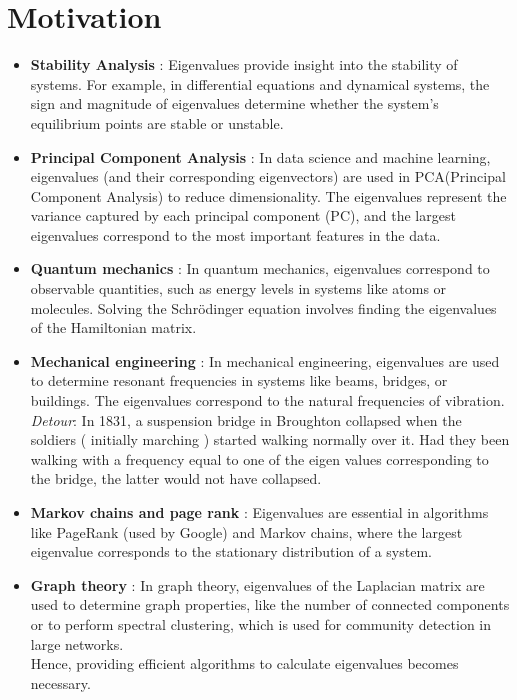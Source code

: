 \documentclass[report,12pt,onecolumn]{IEEEtran}
\theoremstyle{remark}
\begin{document}
\section{\Large Motivation }
\begin{itemize}
	\item \textbf{Stability Analysis} : 
		Eigenvalues provide insight into the stability of systems. For example, in differential equations and dynamical systems, the sign and magnitude of eigenvalues determine whether the system's equilibrium points are stable or unstable.
	\item \textbf{Principal Component Analysis} :
		In data science and machine learning, eigenvalues (and their corresponding eigenvectors) are used in PCA(Principal Component Analysis) to reduce dimensionality. The eigenvalues represent the variance captured by each principal component (PC), and the largest eigenvalues correspond to the most important features in the data.
	\item \textbf{Quantum mechanics} :
		In quantum mechanics, eigenvalues correspond to observable quantities, such as energy levels in systems like atoms or molecules. Solving the Schrödinger equation involves finding the eigenvalues of the Hamiltonian matrix.
	\item \textbf{Mechanical engineering} :
		In mechanical engineering, eigenvalues are used to determine resonant frequencies in systems like beams, bridges, or buildings. The eigenvalues correspond to the natural frequencies of vibration. \\
		\emph{Detour}: In 1831, a suspension bridge in Broughton collapsed when the soldiers ( initially marching ) started walking normally over it. Had they been walking with a frequency equal to one of the eigen values corresponding to the bridge, the latter would not have collapsed.
	\item \textbf{Markov chains and page rank} :
Eigenvalues are essential in algorithms like PageRank (used by Google) and Markov chains, where the largest eigenvalue corresponds to the stationary distribution of a system.
	\item \textbf{Graph theory} :
In graph theory, eigenvalues of the Laplacian matrix are used to determine graph properties, like the number of connected components or to perform spectral clustering, which is used for community detection in large networks. \\
Hence, providing efficient algorithms to calculate eigenvalues becomes necessary.
\end{itemize}
\end{document}
